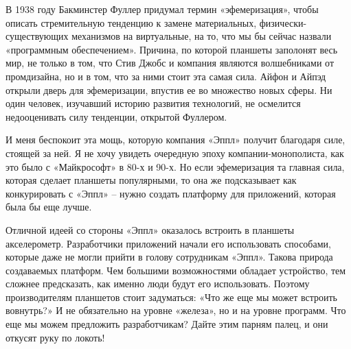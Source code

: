 \documentclass[ebook,12pt,oneside,openany]{memoir}
\begin{document}
В 1938 году Бакминстер Фуллер придумал термин «эфемеризация», чтобы
описать стремительную тенденцию к замене материальных,
физически-существующих механизмов на виртуальные, на то, что мы бы
сейчас назвали «программным обеспечением». Причина, по которой
планшеты заполонят весь мир, не только в том, что Стив Джобс и
компания являются волшебниками от промдизайна, но и в том, что за ними
стоит эта самая сила. Айфон и Айпэд открыли дверь для эфемеризации,
впустив ее во множество новых сферы. Ни один человек, изучавший
историю развития технологий, не осмелится недооценивать силу
тенденции, открытой Фуллером.

И меня беспокоит эта мощь, которую компания «Эппл» получит благодаря
силе, стоящей за ней. Я не хочу увидеть очередную эпоху
компании-монополиста, как это было с «Майкрософт» в 80-х и 90-х. Но
если эфемеризация та главная сила, которая сделает планшеты
популярными, то она же подсказывает как конкурировать с «Эппл» – нужно
создать платформу для приложений, которая была бы еще лучше.

Отличной идеей со стороны «Эппл» оказалось встроить в планшеты
акселерометр. Разработчики приложений начали его использовать
способами, которые даже не могли прийти в голову сотрудникам «Эппл».
Такова природа создаваемых платформ. Чем большими возможностями
обладает устройство, тем сложнее предсказать, как именно люди будут
его использовать. Поэтому производителям планшетов стоит задуматься:
«Что же еще мы может встроить вовнутрь?» И не обязательно на уровне
«железа», но и на уровне программ. Что еще мы можем предложить
разработчикам? Дайте этим парням палец, и они откусят руку по локоть!
\end{document}

